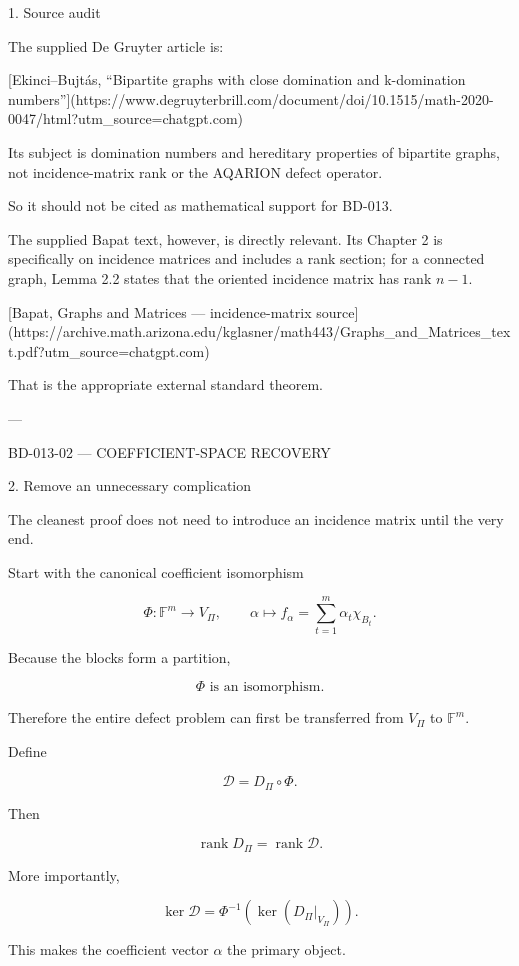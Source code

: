 1. Source audit

The supplied De Gruyter article is:

[Ekinci–Bujtás, “Bipartite graphs with close domination and k-domination numbers”](https://www.degruyterbrill.com/document/doi/10.1515/math-2020-0047/html?utm_source=chatgpt.com)

Its subject is domination numbers and hereditary properties of bipartite graphs, not incidence-matrix rank or the AQARION defect operator. 

So it should not be cited as mathematical support for BD-013.

The supplied Bapat text, however, is directly relevant. Its Chapter 2 is specifically on incidence matrices and includes a rank section; for a connected graph, Lemma 2.2 states that the oriented incidence matrix has rank \(n-1\). 

[Bapat, Graphs and Matrices — incidence-matrix source](https://archive.math.arizona.edu/kglasner/math443/Graphs_and_Matrices_text.pdf?utm_source=chatgpt.com)

That is the appropriate external standard theorem.


---

BD-013-02 — COEFFICIENT-SPACE RECOVERY

2. Remove an unnecessary complication

The cleanest proof does not need to introduce an incidence matrix until the very end.

Start with the canonical coefficient isomorphism

\[
\Phi:\mathbb F^m\longrightarrow V_\Pi,
\qquad
\alpha\mapsto
f_\alpha
=
\sum_{t=1}^m\alpha_t\chi_{B_t}.
\]

Because the blocks form a partition,

\[
\boxed{\Phi\text{ is an isomorphism}.}
\]

Therefore the entire defect problem can first be transferred from \(V_\Pi\) to \(\mathbb F^m\).

Define

\[
\mathcal D
=
D_\Pi\circ\Phi.
\]

Then

\[
\operatorname{rank}D_\Pi
=
\operatorname{rank}\mathcal D.
\]

More importantly,

\[
\ker\mathcal D
=
\Phi^{-1}
\left(
\ker(D_\Pi|_{V_\Pi})
\right).
\]

This makes the coefficient vector \(\alpha\) the primary object.


